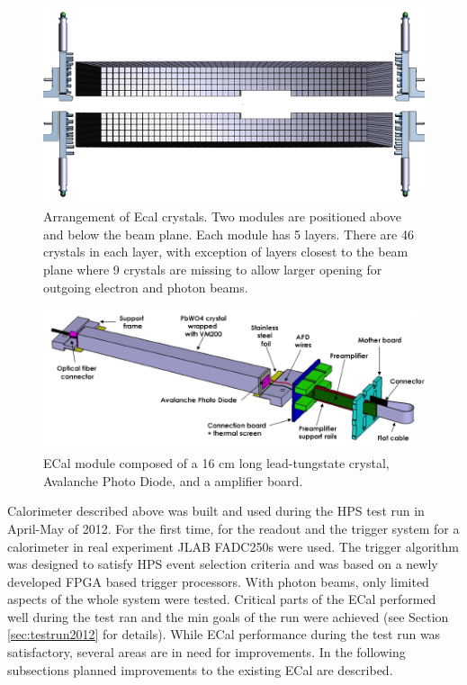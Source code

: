 \begin{figure}[t]
\includegraphics[width=\textwidth]{ecal/ECal.png}
\caption{\small{Arrangement of Ecal crystals. Two modules are positioned above and below the beam plane. Each module has 5 layers. There are 46 crystals in each layer, with exception of layers closest to the beam plane where 9 crystals are missing to allow larger opening for outgoing electron and photon beams.}}\label{fig:ecal}
\end{figure}

\begin{figure}[t]
\includegraphics[width=\textwidth]{ecal/ecal_module.png}
\caption{\small{ECal module composed of a 16 cm long lead-tungstate crystal, Avalanche Photo Diode, and a amplifier board.}}\label{fig:module}
\end{figure}

Calorimeter described above was built and used during the HPS test run in April-May of 2012. For the first time, for the readout and the trigger system for a calorimeter in real experiment JLAB FADC250s were used. The trigger algorithm was designed to satisfy HPS event selection criteria and was based on a newly developed FPGA based trigger processors. With photon beams, only limited aspects of the whole system were tested. Critical parts of the ECal performed well during the test ran and the min goals of the run were achieved (see Section \ref{sec:testrun2012} for details). While ECal performance during the test run was satisfactory, several areas are in need for improvements. In the following subsections planned improvements to the existing ECal are described.   

